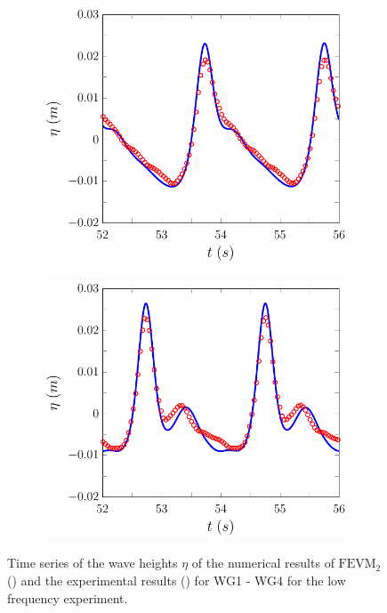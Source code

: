 \begin{figure}
\begin{subfigure}{0.5\textwidth}
		\vspace{0.5cm}
	\end{subfigure}
	\begin{subfigure}{0.5\textwidth}
		\includegraphics[width=\textwidth]{./chp6/figures/Experiment/Beji/sl/FEVMWG3.pdf}
		\vspace{0.5cm}
	\end{subfigure}%
	\begin{subfigure}{0.5\textwidth}
		\includegraphics[width=\textwidth]{./chp6/figures/Experiment/Beji/sl/FEVMWG4.pdf}
		\vspace{0.5cm}
	\end{subfigure}
	\caption{Time series of the wave heights $\eta$ of the numerical results of $\text{FEVM}_2$ ({\color{blue}\solidrule}) and the experimental results () for WG1 - WG4 for the low frequency experiment.}
	\label{fig:BejislWG1to4FEVM}
\end{figure}
